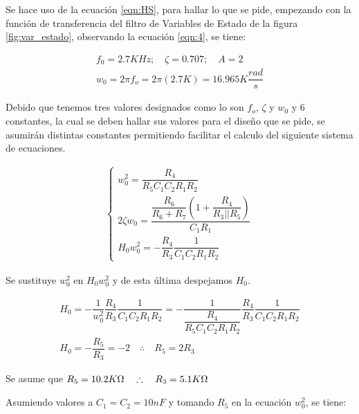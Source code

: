 \begin{enumerate}
\begin{itemize}
            
                    Se hace uso de la ecuación \ref{eqn:HS}, para hallar lo que se pide, empezando con la función de transferencia del filtro de Variables de Estado de la figura \ref{fig:var_estado}, observando la ecuación \ref{eqn:4}, se tiene:
        
                    \begin{gather*}
                        f_0=2.7 KHz ; \quad \zeta=0.707 ; \quad A=2 \\[0.5cm]
                        w_0=2\pi f_o=2\pi (2.7 K)=16.965 K\dfrac{rad}{s}
                    \end{gather*}
        
                    Debido que tenemos tres valores designados como lo son $f_o$, $\zeta$ y $w_0$ y 6 constantes, la cual se deben hallar sus valores para el diseño que se pide, se asumirán distintas constantes permitiendo facilitar el calculo del siguiente sistema de ecuaciones.
        
                    \begin{gather*}
                        \begin{cases}
                            w_0^2=\dfrac{R_4}{R_5C_1C_2R_1R_2}\\[0.5cm]
                            2\zeta w_0=\dfrac{ \dfrac{R_6}{R_6+R_7}\left(1+\dfrac{R_4}{R_3||R_5}\right)}{C_1R_1}\\[0.5cm]
                            H_0w_0^2=-\dfrac{R_4}{R_3}\dfrac{1}{C_1C_2R_1R_2}
                        \end{cases}
                    \end{gather*}
        
                    Se sustituye $w_0^2$ en $H_0w_0^2$ y de esta última despejamos $H_0$.
        
                    \begin{gather*}
                        H_0=-\dfrac{1}{w_0^2}\dfrac{R_4}{R_3}\dfrac{1}{C_1C_2R_1R_2}=-\dfrac{1}{\dfrac{R_4}{R_5C_1C_2R_1R_2}}\dfrac{R_4}{R_3}\dfrac{1}{C_1C_2R_1R_2}\\[0.5cm]
                        H_0=-\dfrac{R_5}{R_3}=-2 \quad \therefore \quad R_5=2R_3
                    \end{gather*}
        
                    Se asume que $R_5=10.2 K \ohm \quad \therefore \quad R_3=5.1K\ohm$ 
                    
                    Asumiendo valores a $C_1=C_2=10nF$ y tomando $R_5$ en la ecuación $w_0^2$, se tiene:
        

\end{itemize}
\end{enumerate}
